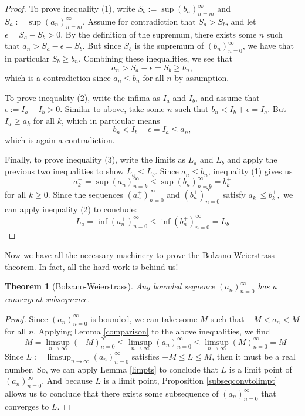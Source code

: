 \documentclass[11pt, oneside]{article}
\newtheorem*{theorem}{Theorem}
\theoremstyle{definition}
\begin{document}
\begin{proof}
    To prove inequality (1), write $S_b := \sup (b_n)_{n=m}^\infty$ and $S_a := \sup (a_n)_{n=m}^\infty$.
    Assume for contradiction that $S_a > S_b$, and let $\epsilon = S_a - S_b > 0$.
    By the definition of the supremum, there exists some $n$ such that $a_n > S_a - \epsilon = S_b$. But since $S_b$ is the supremum of $(b_n)_{n=0}^\infty$, we have
    that in particular $S_b \geq b_n$. Combining these inequalities, we see that
    $$a_n > S_a - \epsilon = S_b \geq b_n,$$
    which is a contradiction since $a_n \leq b_n$ for all $n$ by assumption.

    To prove inequality (2), write the infima as $I_a$ and $I_b$, and assume that $\epsilon := I_a - I_b > 0$.
    Similar to above, take some $n$ such that $b_n < I_b + \epsilon = I_a$. But $I_a \geq a_k$ for all $k$, which in particular means
    $$b_n < I_b + \epsilon = I_a \leq a_n,$$
    which is again a contradiction.

    Finally, to prove inequality (3), write the limits as $L_a$ and $L_b$ and apply the previous two inequalities to show $L_a \leq L_b$.
    Since $a_n \leq b_n$, inequality (1) gives us
    $$a_k^+ = \sup (a_n)_{n=k}^\infty \leq \sup (b_n)_{n=k}^\infty = b_k^+$$
    for all $k \geq 0$. Since the sequences $(a_n^+)_{n=0}^\infty$ and $(b_n^+)_{n=0}^\infty$ satisfy $a_k^+ \leq b_k^+,$ we can apply inequality (2) to conclude:
    $$L_a = \inf (a_n^+)_{n=0}^\infty \leq \inf (b_n^+)_{n=0}^\infty = L_b$$
\end{proof}

Now we have all the necessary machinery to prove the Bolzano-Weierstrass theorem. In fact, all the hard work is behind us!
\begin{theorem}[Bolzano-Weierstrass]
    Any bounded sequence $(a_n)_{n=0}^\infty$ has a convergent subsequence.
\end{theorem}

\begin{proof}
    Since $(a_n)_{n=0}^\infty$ is bounded, we can take some $M$ such that $-M < a_n < M$ for all $n$.
    Applying Lemma \ref{comparison} to the above inequalities, we find
    $$-M = \limsup_{n \rightarrow \infty} (-M)_{n=0}^\infty \leq \limsup_{n \rightarrow \infty} (a_n)_{n=0}^\infty \leq \limsup_{n \rightarrow \infty} (M)_{n=0}^\infty = M$$
    Since $L := \limsup_{n \rightarrow \infty} (a_n)_{n=0}^\infty$ satisfies $-M \leq L \leq M$, then it must be a real number.
    So, we can apply Lemma \ref{limpts} to conclude that $L$ is a limit point of $(a_n)_{n=0}^\infty$.
    And because $L$ is a limit point, Proposition \ref{subseqconvtolimpt} allows us to conclude that there exists some subsequence of $(a_n)_{n=0}^\infty$ that converges to $L$.
\end{proof}
\end{document}

